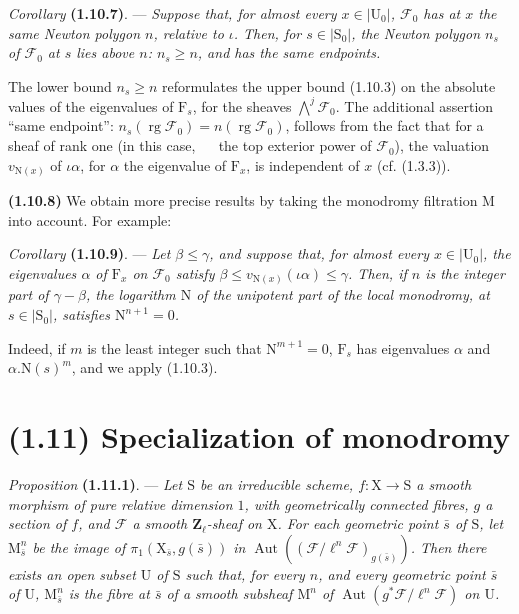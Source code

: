 \documentclass[11pt,leqno]{article}
\newcommand{\Page}[1]{\ifvmode\noindent\else\unskip\ \fi{\footnotesize\textcolor{gray}{[p.\,#1]}}\ \ignorespaces}
\begin{document}
\textit{Corollary} \textbf{(1.10.7)}. — \textit{Suppose that, for almost every \(x\in\lvert\mathrm{U}_0\rvert\), \(\mathscr{F}_0\) has at \(x\) the same Newton polygon \(n\), relative to \(\iota\). Then, for \(s\in\lvert\mathrm{S}_0\rvert\), the Newton polygon \(n_s\) of \(\mathscr{F}_0\) at \(s\) lies above \(n\): \(n_s\geq n\), and has the same endpoints.}

The lower bound \(n_s\geq n\) reformulates the upper bound (1.10.3) on the absolute values of the eigenvalues of \(\mathrm{F}_s\), for the sheaves \(\bigwedge\limits^{j}\mathscr{F}_0\). The additional assertion “same endpoint”: \(n_s(\operatorname{rg}\mathscr{F}_0)=n(\operatorname{rg}\mathscr{F}_0)\), follows from the fact that for a sheaf of rank one (in this case,
\Page{184}
the top exterior power of \(\mathscr{F}_0\)), the valuation \(v_{\mathrm{N}(x)}\) of \(\iota\alpha\), for \(\alpha\) the eigenvalue of \(\mathrm{F}_x\), is independent of \(x\) (cf. (1.3.3)).

\textbf{(1.10.8)} We obtain more precise results by taking the monodromy filtration \(\mathrm{M}\) into account. For example:

\textit{Corollary} \textbf{(1.10.9)}. — \textit{Let \(\beta\leq\gamma\), and suppose that, for almost every \(x\in\lvert\mathrm{U}_0\rvert\), the eigenvalues \(\alpha\) of \(\mathrm{F}_x\) on \(\mathscr{F}_0\) satisfy \(\beta\leq v_{\mathrm{N}(x)}(\iota\alpha)\leq\gamma\). Then, if \(n\) is the integer part of \(\gamma-\beta\), the logarithm \(\mathrm{N}\) of the unipotent part of the local monodromy, at \(s\in\lvert\mathrm{S}_0\rvert\), satisfies \(\mathrm{N}^{n+1}=0\).}

Indeed, if \(m\) is the least integer such that \(\mathrm{N}^{m+1}=0\), \(\mathrm{F}_s\) has eigenvalues \(\alpha\) and \(\alpha.\mathrm{N}(s)^m\), and we apply (1.10.3).

\section*{(1.11) Specialization of monodromy}

\textit{Proposition} \textbf{(1.11.1)}. — \textit{Let \(\mathrm{S}\) be an irreducible scheme, \(f:\mathrm{X}\to\mathrm{S}\) a smooth morphism of pure relative dimension \(1\), with geometrically connected fibres, \(g\) a section of \(f\), and \(\mathscr{F}\) a smooth \(\mathbf{Z}_\ell\)-sheaf on \(\mathrm{X}\). For each geometric point \(\bar{s}\) of \(\mathrm{S}\), let \(\mathrm{M}_{\bar{s}}^n\) be the image of \(\pi_1(\mathrm{X}_{\bar{s}},g(\bar{s}))\) in \(\operatorname{Aut}((\mathscr{F}/\ell^n\mathscr{F})_{g(\bar{s})})\). Then there exists an open subset \(\mathrm{U}\) of \(\mathrm{S}\) such that, for every \(n\), and every geometric point \(\bar{s}\) of \(\mathrm{U}\), \(\mathrm{M}_{\bar{s}}^n\) is the fibre at \(\bar{s}\) of a smooth subsheaf \(\mathrm{M}^n\) of \(\operatorname{Aut}(g^*\mathscr{F}/\ell^n\mathscr{F})\) on \(\mathrm{U}\).}
\end{document}
